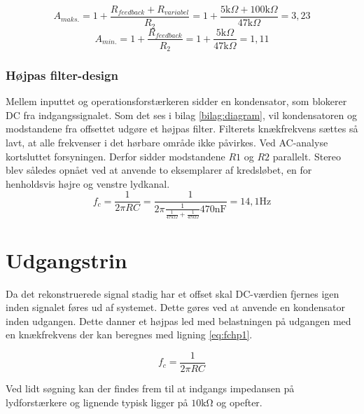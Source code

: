 \begin{equation}
\label{eq:Aminfors}
A_{maks.} = 1 + \frac{R_{feedback} + R_{variabel}}{R_2} = 1 + \frac{5\text{k} \Omega + 100\text{k} \Omega}{47\text{k} \Omega} = 3,23
\end{equation}
\begin{equation}
\label{Amaksfors}
A_{min.} = 1 + \frac{R_{feedback}}{R_2} = 1 + \frac{5\text{k} \Omega}{47\text{k} \Omega} = 1,11
\end{equation}

\subsubsection{Højpas filter-design}
Mellem inputtet og operationsforstærkeren sidder en kondensator, som blokerer DC fra indgangssignalet. 
Som det ses i bilag \ref{bilag:diagram}, vil kondensatoren og modstandene fra offsettet udgøre et højpas filter. 
Filterets knækfrekvens sættes så lavt, at alle frekvenser i det hørbare område ikke påvirkes. 
Ved AC-analyse kortsluttet forsyningen. Derfor sidder modstandene $R1$ og $R2$ parallelt.
Stereo blev således opnået ved at anvende to eksemplarer af kredsløbet, en for henholdsvis højre og venstre lydkanal.
\begin{equation}
f_c = \frac{1}{2\pi R C} = \frac{1}{2 \pi \frac{1}{\frac{1}{47k \Omega}+\frac{1}{47k \Omega}}  470\text{nF}} = 14,1\text{Hz}
\end{equation}

\section{Udgangstrin}

Da det rekonstruerede signal stadig har et offset skal DC-værdien fjernes igen inden signalet føres ud af systemet.
Dette gøres ved at anvende en kondensator inden udgangen. Dette danner et højpas led med belastningen på udgangen med en knækfrekvens der kan beregnes med ligning \ref{eq:fchp1}.

\begin{equation}
	f_c = \frac{1}{2\pi RC}
\label{eq:fchp1}
\end{equation}

Ved lidt søgning kan der findes frem til at indgangs impedansen på lydforstærkere og lignende typisk ligger på $10\si{\kilo\ohm}$ og opefter.

